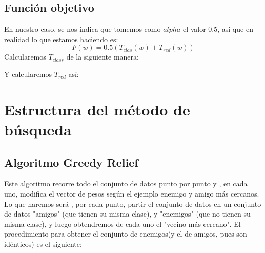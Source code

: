 \documentclass[11pt]{article}
\makeatletter
\def\BState{\State\hskip-\ALG@thistlm}
\makeatother
\begin{document}
\subsection{Función objetivo}
En nuestro caso, se nos indica que tomemos como $alpha$ el valor $0.5$, así que en realidad lo que estamos haciendo es:
\[
F(w) = 0.5(T_{clas}(w) + T_{red}(w))
\]
Calcularemos $T_{class}$ de la siguiente manera:\\
Y calcularemos $T_{red}$ así:\\


\section{Estructura del método de búsqueda}
\subsection{Algoritmo Greedy Relief}
Este algoritmo recorre todo el conjunto de datos punto por punto y , en cada uno, modifica el vector de pesos según el ejemplo enemigo y amigo más cercanos. Lo que haremos será , por cada punto, partir el conjunto de datos en un conjunto de datos "amigos" (que tienen su misma clase), y "enemigos" (que no tienen su misma clase), y luego obtendremos de cada uno el "vecino más cercano". El procedimiento para obtener el conjunto de enemigos(y el de amigos, pues son idénticos) es el siguiente:\\

\end{document}
